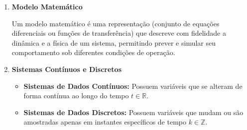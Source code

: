 \begin{enumerate}[label=\textbf{\arabic*)}, leftmargin=*]
    \item \textbf{Modelo Matemático}
    
    Um modelo matemático é uma representação (conjunto de equações diferenciais ou funções de transferência) que descreve com fidelidade a dinâmica e a física de um sistema, permitindo prever e simular seu comportamento sob diferentes condições de operação.

    \item \textbf{Sistemas Contínuos e Discretos}
    
    \begin{itemize}
        \item \textbf{Sistemas de Dados Contínuos:} Possuem variáveis que se alteram de forma contínua ao longo do tempo $t \in \mathbb{R}$.
        \item \textbf{Sistemas de Dados Discretos:} Possuem variáveis que mudam ou são amostradas apenas em instantes específicos de tempo $k \in \mathbb{Z}$.
    \end{itemize}

\end{enumerate}